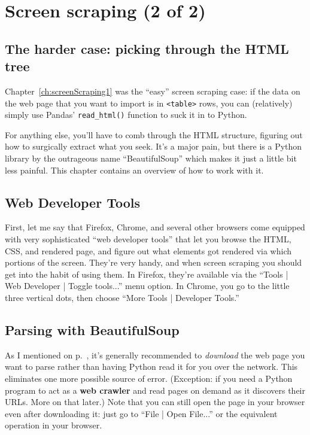 
\chapter{Screen scraping (2 of 2)}
\label{ch:screenScraping2}


\section{The harder case: picking through the HTML tree}

Chapter~\ref{ch:screenScraping1} was the ``easy'' screen scraping case: if the
data on the web page that you want to import is in \texttt{<table>} rows, you
can (relatively) simply use Pandas' \texttt{read\_html()} function to suck it
in to Python.

For anything else, you'll have to comb through the HTML structure, figuring out
how to surgically extract what you seek. It's a major pain, but there is a
Python library by the outrageous name ``BeautifulSoup'' which makes it just a
little bit less painful. This chapter contains an overview of how to work with
it.


\section{Web Developer Tools}


First, let me say that Firefox, Chrome, and several other browsers come
equipped with very sophisticated ``web developer tools'' that let you browse
the HTML, CSS, and rendered page, and figure out what elements got rendered via
which portions of the screen. They're very handy, and when screen scraping you
should get into the habit of using them. In Firefox, they're available via the
``Tools | Web Developer | Toggle tools...'' menu option. In Chrome, you go to
the little three vertical dots, then choose ``More Tools | Developer Tools.''


\section{Parsing with BeautifulSoup}


As I mentioned on p.~\pageref{downloading}, it's generally recommended to
\textit{download} the web page you want to parse rather than having Python read
it for you over the network. This eliminates one more possible source of error.
(Exception: if you need a Python program to act as a \textbf{web crawler} and
read pages on demand as it discovers their URLs. More on that later.) Note that
you can still open the page in your browser even after downloading it: just go
to ``File | Open File...'' or the equivalent operation in your browser.

